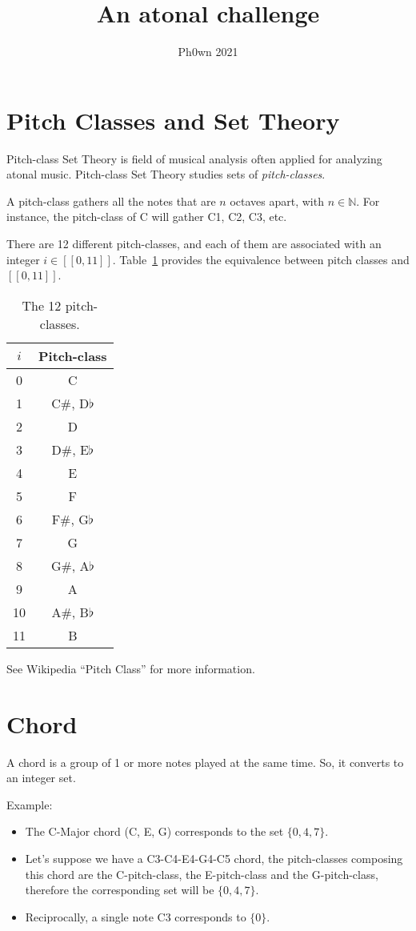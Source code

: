 \documentclass[12pt]{scrartcl}
\title{An atonal challenge}
\subtitle{Ph0wn 2021}
\date{}
\begin{document}
\maketitle


\section*{Pitch Classes and Set Theory}

Pitch-class Set Theory is field of musical analysis often applied for analyzing atonal music. Pitch-class Set Theory studies sets of \emph{pitch-classes}.

A pitch-class gathers all the notes that are $n$ octaves apart, with $n \in \mathbb{N}$. For instance, the pitch-class of C will gather C1, C2, C3, etc.

There are 12 different pitch-classes, and each of them are associated with an integer $i \in [\![0,11]\!]$. Table~\ref{table:pitch-classes} provides the equivalence between pitch classes and $[\![0,11]\!]$.

\begin{table}[ht]
	\centering
	\begin{tabular}{c|c}
		$i$ & Pitch-class\\
		\hline
		\hline
		0 & C\\
		\hline
		1 & C\#, D$\flat$\\
		\hline
		2 & D\\
		\hline
		3 & D\#, E$\flat$\\
		\hline
		4 & E\\
		\hline
		5 & F\\
		\hline
		6 & F\#, G$\flat$\\
		\hline
		7 & G\\
		\hline
		8 & G\#, A$\flat$\\
		\hline
		9 & A\\
		\hline
		10 & A\#, B$\flat$\\
		\hline
		11 & B
	\end{tabular}
	\caption{The 12 pitch-classes.}
	\label{table:pitch-classes}
\end{table}

See Wikipedia ``Pitch Class'' for more information.

\section*{Chord}

A chord is a group of 1 or more notes played at the same time. So, it converts to an integer set.

Example:
\begin{itemize}
  \item The C-Major chord (C, E, G) corresponds to the set $\{0,4,7\}$.
  \item Let's suppose we have a C3-C4-E4-G4-C5 chord, the pitch-classes composing this chord are the C-pitch-class, the E-pitch-class and the G-pitch-class, therefore the corresponding set will be $\{0,4,7\}$.
  \item Reciprocally, a single note C3 corresponds to $\{0\}$.
\end{itemize}
\end{document}
